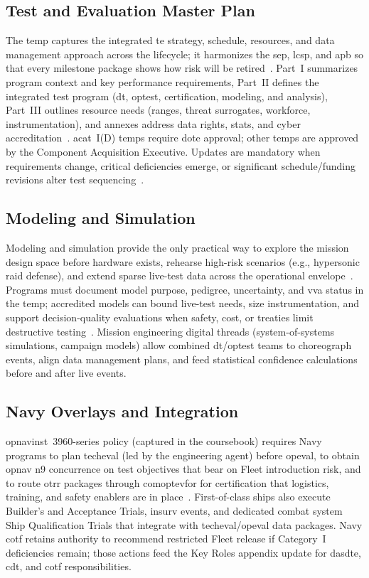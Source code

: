 \documentclass[../main.tex]{subfiles}
\begin{document}
\subsection{Test and Evaluation Master Plan}
The \ac{temp} captures the integrated \ac{te} strategy, schedule, resources, and data management approach across the lifecycle; it harmonizes the \ac{sep}, \ac{lcsp}, and \ac{apb} so that every milestone package shows how risk will be retired~\autocite{DoDAcqGuidebook}. Part~I summarizes program context and key performance requirements, Part~II defines the integrated test program (\ac{dt}, \ac{optest}, certification, modeling, and analysis), Part~III outlines resource needs (ranges, threat surrogates, workforce, instrumentation), and annexes address data rights, stats, and cyber accreditation~\autocite{DoDI5000-89}. \ac{acat}~I(D) \acp{temp} require \ac{dote} approval; other \acp{temp} are approved by the Component Acquisition Executive. Updates are mandatory when requirements change, critical deficiencies emerge, or significant schedule/funding revisions alter test sequencing~\autocite{DoDI5000-85}.

\subsection{Modeling and Simulation}
Modeling and simulation provide the only practical way to explore the mission design space before hardware exists, rehearse high-risk scenarios (e.g., hypersonic raid defense), and extend sparse live-test data across the operational envelope~\autocite{edo-3-5-5-test-eval-part-i-2025}. Programs must document model purpose, pedigree, uncertainty, and \ac{vva} status in the \ac{temp}; accredited models can bound live-test needs, size instrumentation, and support decision-quality evaluations when safety, cost, or treaties limit destructive testing~\autocite{DoDI5000-89}. Mission engineering digital threads (system-of-systems simulations, campaign models) allow combined \ac{dt}/\ac{optest} teams to choreograph events, align data management plans, and feed statistical confidence calculations before and after live events.

\subsection{Navy Overlays and Integration}
\ac{opnavinst}~3960-series policy (captured in the coursebook) requires Navy programs to plan \ac{techeval} (led by the engineering agent) before \ac{opeval}, to obtain \ac{opnav} \ac{n9} concurrence on test objectives that bear on Fleet introduction risk, and to route \ac{otrr} packages through \ac{comoptevfor} for certification that logistics, training, and safety enablers are in place~\autocite{edo-3-5-6-test-eval-part-ii-2025}. First-of-class ships also execute Builder's and Acceptance Trials, \ac{insurv} events, and dedicated combat system Ship Qualification Trials that integrate with \ac{techeval}/\ac{opeval} data packages. Navy \ac{cotf} retains authority to recommend restricted Fleet release if Category~I deficiencies remain; those actions feed the Key Roles appendix update for \ac{dasdte}, \ac{cdt}, and \ac{cotf} responsibilities.
\end{document}
